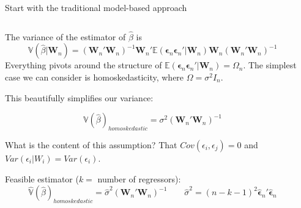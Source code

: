 \documentclass[notes,11pt, aspectratio=169]{beamer}
\newenvironment{wideitemize}{\itemize\addtolength{\itemsep}{10pt}}{\enditemize}
\begin{document}
\begin{frame}{Start with the traditional model-based approach}
\begin{columns}[T] %
\begin{column}{.8\textwidth}
  \begin{wideitemize}
  \item The variance of the estimator of $\hat{\beta}$ is
    \begin{equation}
      \mathbb{V}(\hat{\beta} |\mathbf{W}_{n}) = (\mathbf{W}_{n}'\mathbf{W}_{n})^{-1}\mathbf{W}_{n}'\mathbb{E}(\boldsymbol{\epsilon}_{n}\boldsymbol{\epsilon}_{n}'|\mathbf{W}_{n})\mathbf{W}_{n} (\mathbf{W}_{n}'\mathbf{W}_{n})^{-1}
    \end{equation}
    Everything pivots around the structure of
    $\mathbb{E}(\boldsymbol{\epsilon}_{n}\boldsymbol{\epsilon}_{n}'|\mathbf{W}_{n}) = \Omega_{n}$. The simplest case we can consider is homoskedasticity, where $\Omega = \sigma^{2}I_{n}$.
    \item This beautifully simplifies our variance:
    
    \begin{equation}
      \mathbb{V}(\hat{\beta})_{homoskedastic} = \sigma^{2} (\mathbf{W}_{n}'\mathbf{W}_{n})^{-1}
    \end{equation}
  \item What is the content of this assumption? That $Cov(\epsilon_{i},\epsilon_{j}) = 0$ and  $Var(\epsilon_{i} |W_{i}) = Var(\epsilon_{i})$.
  \item Feasible estimator ($k =$ number of regressors):
    \begin{equation}
      \hat{\mathbb{V}}(\hat{\beta})_{homoskedastic} = \hat{\sigma}^{2} (\mathbf{W}_{n}'\mathbf{W}_{n})^{-1}  \qquad \hat{\sigma}^{2} = (n-k-1)^{2}\boldsymbol{\hat{\epsilon}}_{n}' \boldsymbol{\hat{\epsilon}}_{n} 
    \end{equation}
  \end{wideitemize}
  \end{column}%
  \hfill%
  \begin{column}{.5\textwidth}
  \end{column}
\end{columns}
  
\end{frame}
\end{document}
